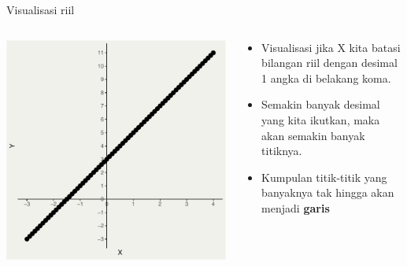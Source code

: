 \documentclass[
  ignorenonframetext,
]{beamer}
\begin{document}
\begin{frame}{Visualisasi riil}
\label{visualisasi-riil-1}
\begin{columns}[T]
\begin{column}{0.47\textwidth}
\includegraphics{index_files/figure-beamer/unnamed-chunk-3-1.pdf}
\end{column}

\begin{column}{0.47\textwidth}
\begin{itemize}
\item
  Visualisasi jika X kita batasi bilangan riil dengan desimal 1 angka di
  belakang koma.
\item
  Semakin banyak desimal yang kita ikutkan, maka akan semakin banyak
  titiknya.
\item
  Kumpulan titik-titik yang banyaknya tak hingga akan menjadi
  \textbf{garis}
\end{itemize}
\end{column}
\end{columns}
\end{frame}
\end{document}
